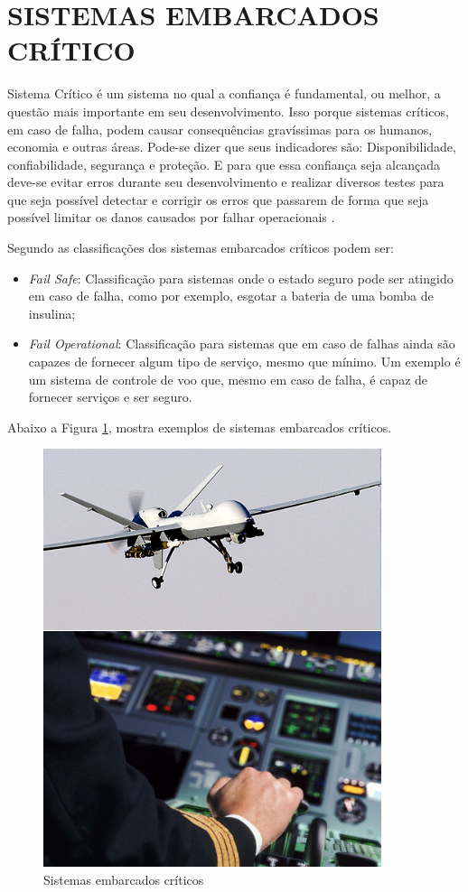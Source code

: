 \section{SISTEMAS EMBARCADOS CRÍTICO}
\label{sec:SistemaEmbarcado}

Sistema Crítico é um sistema no qual a confiança é fundamental, ou melhor, a questão mais importante em seu desenvolvimento. Isso porque sistemas críticos, em caso de falha, podem causar consequências gravíssimas para os humanos, economia e outras áreas. Pode-se dizer que seus indicadores são: Disponibilidade, confiabilidade, segurança e proteção. E para que essa confiança seja alcançada deve-se evitar erros durante seu desenvolvimento e realizar diversos testes para que seja possível detectar e corrigir os erros que passarem de forma que seja possível limitar os danos causados por falhar operacionais \cite{sommerville2004software,feldmann2007survey,jordan2006standard}.

Segundo \cite{kopetz2011real} as classificações dos sistemas embarcados críticos podem ser:
\begin{itemize}
\item \emph{Fail Safe}: Classificação para sistemas onde o estado seguro pode ser atingido em caso de falha, como por exemplo, esgotar a bateria de uma bomba de insulina;
\item \emph{Fail Operational}: Classificação para sistemas que em caso de falhas ainda são capazes de fornecer algum tipo de serviço, mesmo que mínimo. Um exemplo é um sistema de controle de voo que, mesmo em caso de falha, é capaz de fornecer serviços e ser seguro.
\end{itemize}

Abaixo a Figura \ref{fig:exSistEmbarcado},  mostra exemplos de sistemas embarcados críticos.

\begin{figure}[htp]
	\centering
	\includegraphics[scale=0.7]{images/exemplo_sistemas_embarcados_criticos.png}	
	\caption{Sistemas embarcados críticos}
	\label{fig:exSistEmbarcado}	
\end{figure}

